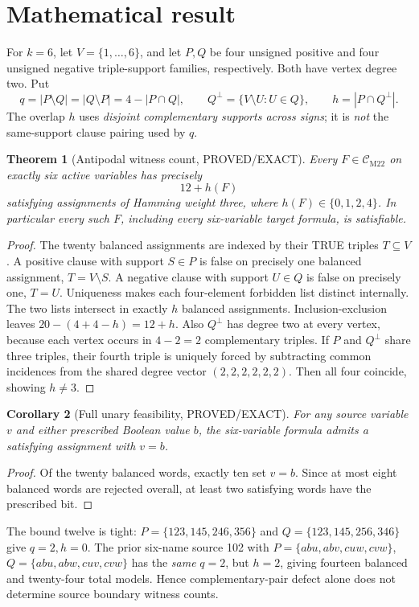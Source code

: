 \documentclass[11pt]{article}
\newtheorem{theorem}{Theorem}
\newtheorem{corollary}[theorem]{Corollary}
\newcommand{\CM}{\mathcal C_{\mathrm{M22}}}
\begin{document}
\section{Mathematical result}
For \(k=6\), let \(V=\{1,\ldots,6\}\), and let \(P,Q\) be four unsigned positive and four unsigned negative triple-support families, respectively. Both have vertex degree two. Put
\[
q=|P\setminus Q|=|Q\setminus P|=4-|P\cap Q|,
\qquad Q^\perp=\{V\setminus U:U\in Q\},\qquad
h=|P\cap Q^\perp|.
\]
The overlap \(h\) uses \emph{disjoint complementary supports across signs}; it is \emph{not} the same-support clause pairing used by \(q\).
\begin{theorem}[Antipodal witness count, PROVED/EXACT]\label{th:main}
Every \(F\in\CM\) on exactly six active variables has precisely
\[
\boxed{12+h(F)}
\]
satisfying assignments of Hamming weight three, where \(h(F)\in\{0,1,2,4\}\). In particular every such \(F\), including every six-variable target formula, is satisfiable.
\end{theorem}
\begin{proof}
The twenty balanced assignments are indexed by their TRUE triples \(T\subseteq V\). A positive clause with support \(S\in P\) is false on precisely one balanced assignment, \(T=V\setminus S\). A negative clause with support \(U\in Q\) is false on precisely one, \(T=U\). Uniqueness makes each four-element forbidden list distinct internally. The two lists intersect in exactly \(h\) balanced assignments. Inclusion-exclusion leaves \(20-(4+4-h)=12+h\). Also \(Q^\perp\) has degree two at every vertex, because each vertex occurs in \(4-2=2\) complementary triples. If \(P\) and \(Q^\perp\) share three triples, their fourth triple is uniquely forced by subtracting common incidences from the shared degree vector \((2,2,2,2,2,2)\). Then all four coincide, showing \(h\ne3\).
\end{proof}
\begin{corollary}[Full unary feasibility, PROVED/EXACT]
For any source variable \(v\) and either prescribed Boolean value \(b\), the six-variable formula admits a satisfying assignment with \(v=b\).
\end{corollary}
\begin{proof}
Of the twenty balanced words, exactly ten set \(v=b\). Since at most eight balanced words are rejected overall, at least two satisfying words have the prescribed bit.
\end{proof}
The bound twelve is tight: \(P=\{123,145,246,356\}\) and \(Q=\{123,145,256,346\}\) give \(q=2,h=0\). The prior six-name source 102 with \(P=\{abu,abv,cuw,cvw\}\), \(Q=\{abu,abw,cuv,cvw\}\) has the \emph{same} \(q=2\), but \(h=2\), giving fourteen balanced and twenty-four total models. Hence complementary-pair defect alone does not determine source boundary witness counts.
\end{document}
